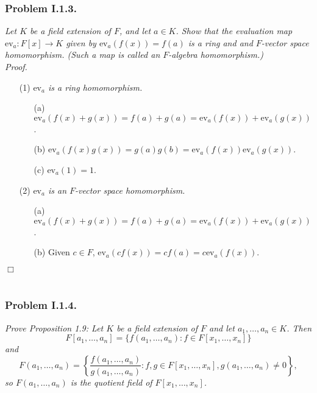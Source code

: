 \documentclass{article}
\begin{document}



\subsubsection*{Problem I.1.3.}
\emph{Let $K$ be a field extension of $F$, and let $a \in K$.
Show that the evaluation map $\text{ev}_a: F[x] \to K$ given by
$\text{ev}_a(f(x)) = f(a)$ is a ring and and $F$-vector space homomorphism.
(Such a map is called an $F$-algebra homomorphism.) } \\

\emph{Proof.}
\begin{enumerate}
\item[(1)]
\emph{$\text{ev}_a$ is a ring homomorphism.}
  \begin{enumerate}
  \item[(a)]
  $\text{ev}_a(f(x)+g(x)) = f(a) + g(a) = \text{ev}_a(f(x)) + \text{ev}_a(g(x))$.
  \item[(b)]
  $\text{ev}_a(f(x)g(x)) = g(a)g(b) = \text{ev}_a(f(x)) \text{ev}_a(g(x))$.
  \item[(c)]
  $\text{ev}_a(1) = 1$.
  \end{enumerate}
\item[(2)]
\emph{$\text{ev}_a$ is an $F$-vector space homomorphism.}
  \begin{enumerate}
  \item[(a)]
  $\text{ev}_a(f(x)+g(x)) = f(a) + g(a) = \text{ev}_a(f(x)) + \text{ev}_a(g(x))$.
  \item[(b)]
  Given $c \in F$, $\text{ev}_a(cf(x)) = cf(a) = c\text{ev}_a(f(x))$.
  \end{enumerate}
\end{enumerate}
$\Box$ \\\\





\subsubsection*{Problem I.1.4.}
\emph{Prove Proposition 1.9:
Let $K$ be a field extension of $F$ and let $a_1, \ldots, a_n \in K$.
Then
$$F[a_1, \ldots, a_n] = \{ f(a_1, \ldots, a_n) : f \in F[x_1, \ldots, x_n] \}$$
and
$$F(a_1, \ldots, a_n) = \left\{
\frac{f(a_1, \ldots, a_n)}{g(a_1, \ldots, a_n)} : f, g \in F[x_1, \ldots, x_n],
g(a_1, \ldots, a_n) \neq 0
\right\},$$
so $F(a_1, \ldots, a_n)$ is the quotient field of $F[x_1, \ldots, x_n]$.
} \\
\end{document}
